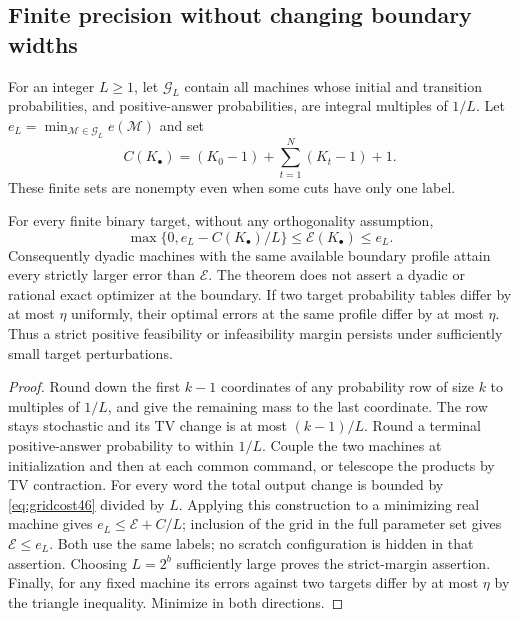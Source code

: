 \subsection{Finite precision without changing boundary widths}
For an integer $L\ge1$, let $\mathcal G_L$ contain all machines whose
initial and transition probabilities, and positive-answer probabilities,
are integral multiples of $1/L$. Let
$e_L=\min_{\mathcal M\in\mathcal G_L}e(\mathcal M)$ and set
\begin{equation}\label{eq:gridcost46}
 C(K_\bullet)=(K_0-1)+\sum_{t=1}^N(K_t-1)+1.
\end{equation}
These finite sets are nonempty even when some cuts have only one label.

\begin{theorem}\label{thm:grid46}
For every finite binary target, without any orthogonality assumption,
\begin{equation}\label{eq:grid46}
 \max\{0,e_L-C(K_\bullet)/L\}
       \le\mathcal E(K_\bullet)\le e_L.
\end{equation}
Consequently dyadic machines with the same available boundary profile
attain every strictly larger error than $\mathcal E$. The theorem
does not assert a dyadic or rational exact optimizer at the boundary.
If two target probability tables differ by at most $\eta$ uniformly,
their optimal errors at the same profile differ by at most $\eta$.
Thus a strict positive feasibility or infeasibility margin persists
under sufficiently small target perturbations.
\end{theorem}
\begin{proof}
Round down the first $k-1$ coordinates of any probability row of size
$k$ to multiples of $1/L$, and give the remaining mass to the last
coordinate. The row stays stochastic and its TV change is at most
$(k-1)/L$. Round a terminal positive-answer probability to within $1/L$.
Couple the two machines at initialization and then at each common
command, or telescope the products by TV contraction. For every word
the total output change is bounded by \eqref{eq:gridcost46} divided by
$L$. Applying this construction to a minimizing real machine gives
$e_L\le\mathcal E+C/L$; inclusion of the grid in the full parameter
set gives $\mathcal E\le e_L$. Both use the same labels; no scratch
configuration is hidden in that assertion. Choosing $L=2^b$ sufficiently
large proves the strict-margin assertion. Finally, for any fixed
machine its errors against two targets differ by at most $\eta$ by the
triangle inequality. Minimize in both directions.
\end{proof}

